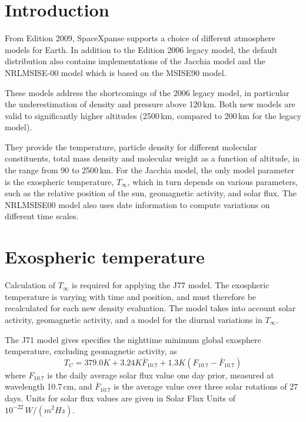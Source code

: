 \documentclass[a4paper]{article}
\begin{document}



\newcommand{\vR}[1]{\ensuremath{\vec{R}_{#1}}}
\newcommand{\nR}[1]{\ensuremath{|\vR{#1}|}}
\newcommand{\mat}[1]{\ensuremath{\mathsf{#1}}}
\newcommand{\Kelvin}{\ensuremath{\mathrm{K}}}

\maketitle

\section{Introduction}
From Edition 2009, SpaceXpanse supports a choice of different atmosphere models for Earth. In addition to the Edition 2006 legacy model, the default distribution also contains implementations of the Jacchia model \cite{jacchia65, jacchia71, jacchia77} and the NRLMSISE-00 model which is based on the MSISE90 model.

These models address the shortcomings of the 2006 legacy model, in particular the underestimation of density and pressure above 120\,km. Both new models are valid to significantly higher altitudes (2500\,km, compared to 200\,km for the legacy model).

They provide the temperature, particle density for different molecular constituents, total mass density and molecular weight as a function of altitude, in the range from 90 to 2500\,km. For the Jacchia model, the only model parameter is the exospheric temperature, $T_\infty$, which in turn depends on various parameters, such as the relative position of the sun, geomagnetic activity, and solar flux. The NRLMSISE00 model also uses date information to compute variations on different time scales.

\section{Exospheric temperature}
Calculation of $T_\infty$ is required for applying the J77 model. The exospheric temperature is varying with time and position, and must therefore be recalculated for each new density evaluation. The model takes into account solar activity, geomagnetic activity, and a model for the diurnal variations in $T_\infty$.

The J71 model gives specifies the nighttime minimum global exosphere temperature, excluding geomagnetic activity, as
\begin{equation}
T_C = 379.0K + 3.24K \bar{F}_{10.7} + 1.3K(F_{10.7}-\bar{F}_{10.7})
\end{equation}
where $F_{10.7}$ is the daily average solar flux value one day prior, measured at wavelength 10.7\,cm, and $\bar{F}_{10.7}$ is the average value over three solar rotations of 27 days. Units for solar flux values are given in Solar Flux Units of $10^{-22}\,W/(m^2 Hz)$.
\end{document}
